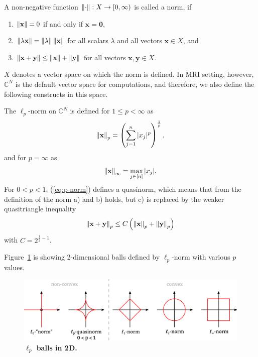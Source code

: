 \begin{tight_equations}
\begin{definition}[norm]
A non-negative function $\left\lVert\cdot\right\rVert: X \rightarrow [0, \infty)$ is called a norm, if 
\begin{enumerate}[label=\alph*)]
    \item $\left\lVert\mathbf{x}\right\rVert = 0$ if and only if $\mathbf{x} = \mathbf{0}$,
    \item $\left\lVert\lambda \mathbf{x}\right\rVert = \Vert \lambda \Vert \left\lVert\mathbf{x}\right\rVert$ for all scalars $\lambda$ and all vectors $\mathbf{x} \in X$, and
    \item $\left\lVert\mathbf{x} + \mathbf{y}\right\rVert \le \left\lVert\mathbf{x}\right\rVert + \left\lVert\mathbf{y}\right\rVert$ for all vectors $\mathbf{x, y} \in X$.
\end{enumerate}
\end{definition}

\begin{remark}
$X$ denotes a vector space on which the norm is defined. In MRI setting, however, $\mathbb{C}^N$ is the default vector space for computations, and therefore, we also define the following constructs in this space.
\end{remark}

\begin{definition}
The $\ell_p$-norm on $\mathbb{C}^N$ is defined for $1 \le p < \infty$ as
\begin{equation}\label{eq:p-norm}
\left\lVert\mathbf{x}\right\rVert_p = \left(\sum_{j=1}^n |x_j|^p\right)^{\frac{1}{p}},
\end{equation}
and for $p = \infty$ as
\[\left\lVert\mathbf{x}\right\rVert_\infty = \max_{j \in [n]} | x_j |.\]
For $0 < p < 1$, (\ref{eq:p-norm}) defines a quasinorm, which means that from the definition of the norm a) and b) holds, but c) is replaced by the weaker quasitriangle inequality
\[\left\lVert\mathbf{x} + \mathbf{y}\right\rVert_p \le C\left(\left\lVert\mathbf{x}\right\rVert_p + \left\lVert\mathbf{y}\right\rVert_p\right)\]
with $C = 2^{\frac{1}{2}-1}$.
\end{definition}

\begin{remark}
Figure~\ref{fig:balls} is showing 2-dimensional balls defined by $\ell_p$-norm with various $p$ values.
\end{remark}

\begin{figure}
    \centering
    \includegraphics[width=\textwidth]{images/balls.pdf}
    \caption{\textbf{$\ell_p$ balls in 2D.}}
    \label{fig:balls}
\end{figure}


\end{tight_equations}
